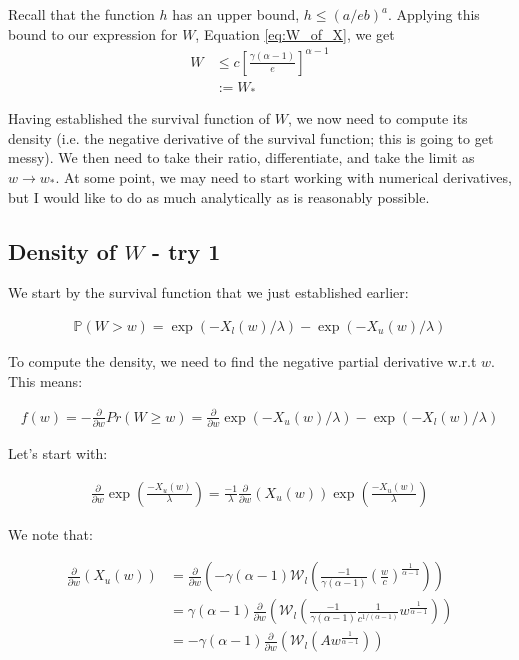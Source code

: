 \documentclass{article}
\newcommand{\bP}{\mathbb{P}}
\newcommand{\sW}{\mathscr{W}}
\begin{document}
Recall that the function $h$ has an upper bound, $h \leq (a / eb)^a$. Applying this bound to our expression for $W$, Equation \eqref{eq:W_of_X}, we get
\begin{align}
W &\leq c \left[ \frac{\gamma (\alpha - 1)}{e} \right]^{\alpha - 1}\\
&:= W_* \nonumber
\end{align}

Having established the survival function of $W$, we now need to compute its density (i.e. the negative derivative of the survival function; this is going to get messy). We then need to take their ratio, differentiate, and take the limit as $w \rightarrow w_*$. At some point, we may need to start working with numerical derivatives, but I would like to do as much analytically as is reasonably possible.

\subsection{Density of $W$ - try 1}

We start by the survival function that we just established earlier:

\begin{align}
\bP(W > w) = \exp(-X_l(w)/ \lambda) - \exp(-X_u(w)/\lambda)
\end{align}

To compute the density, we need to find the negative partial derivative w.r.t $w$. This means: 

\begin{align}
f(w) = - \frac{\partial}{\partial w} Pr(W \ge w) = \frac{\partial}{\partial w} \exp(-X_u(w)/ \lambda) - \exp(-X_l(w)/\lambda)
\end{align}

Let's start with:

\begin{align}
\frac{\partial}{\partial w} \exp \left( \frac{-X_{u}(w)}{\lambda} \right) = \frac{-1}{\lambda} \frac{\partial}{\partial w}(X_{u}(w)) \exp(\frac{-X_{u}(w)}{\lambda})
\end{align}

We note that:

\begin{align}
\frac{\partial}{\partial w}(X_{u}(w)) &= \frac{\partial}{\partial w} \left( -\gamma (\alpha - 1) \sW_l \left( \frac{-1}{\gamma (\alpha-1)} \left(\frac{w}{c}\right)^{\frac{1}{\alpha-1}} \right) \right) \\
&= \gamma (\alpha - 1) \frac{\partial}{\partial w} \left( \sW_l(\frac{-1}{\gamma (\alpha-1)} \frac{1}{c^{1/(\alpha-1)}} w^{\frac{1}{\alpha-1}})  \right) \\
&= -\gamma (\alpha-1) \frac{\partial}{\partial w} \left( \sW_l(A w^{\frac{1}{\alpha-1}}) \right)
\end{align}
\end{document}
